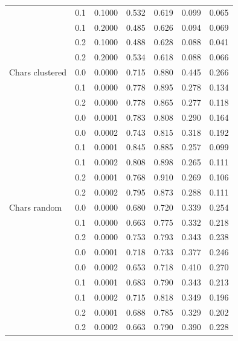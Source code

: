 \documentclass{article}
\begin{document}
\begin{table}[!htb]
\begin{tabular}{l||rr|rr|rr}
		& 0.1 &     0.1000 &         0.532 &          0.619 &    0.099 &     0.065 \\
		& 0.1 &     0.2000 &         0.485 &          0.626 &    0.094 &     0.069 \\
		& 0.2 &     0.1000 &         0.488 &          0.628 &    0.088 &     0.041 \\
		& 0.2 &     0.2000 &         0.534 &          0.618 &    0.088 &     0.066 \\
		\midrule
		Chars clustered & 0.0 &     0.0000 &         0.715 &          0.880 &    0.445 &     0.266 \\
		& 0.1 &     0.0000 &         0.778 &          0.895 &    0.278 &     0.134 \\
		& 0.2 &     0.0000 &         0.778 &          0.865 &    0.277 &     0.118 \\
		& 0.0 &     0.0001 &         0.783 &          0.808 &    0.290 &     0.164 \\
		& 0.0 &     0.0002 &         0.743 &          0.815 &    0.318 &     0.192 \\
		& 0.1 &     0.0001 &         0.845 &          0.885 &    0.257 &     0.099 \\
		& 0.1 &     0.0002 &         0.808 &          0.898 &    0.265 &     0.111 \\
		& 0.2 &     0.0001 &         0.768 &          0.910 &    0.269 &     0.106 \\
		& 0.2 &     0.0002 &         0.795 &          0.873 &    0.288 &     0.111 \\
		\midrule
		Chars random & 0.0 &     0.0000 &         0.680 &          0.720 &    0.339 &     0.254 \\
		& 0.1 &     0.0000 &         0.663 &          0.775 &    0.332 &     0.218 \\
		& 0.2 &     0.0000 &         0.753 &          0.793 &    0.343 &     0.238 \\
		& 0.0 &     0.0001 &         0.718 &          0.733 &    0.377 &     0.246 \\
		& 0.0 &     0.0002 &         0.653 &          0.718 &    0.410 &     0.270 \\
		& 0.1 &     0.0001 &         0.683 &          0.790 &    0.343 &     0.213 \\
		& 0.1 &     0.0002 &         0.715 &          0.818 &    0.349 &     0.196 \\
		& 0.2 &     0.0001 &         0.688 &          0.785 &    0.329 &     0.202 \\
		& 0.2 &     0.0002 &         0.663 &          0.790 &    0.390 &     0.228 \\
		\bottomrule
	\end{tabular}
	\label{table:MIC_0_vs_50_all}
\end{table}
\end{document}
